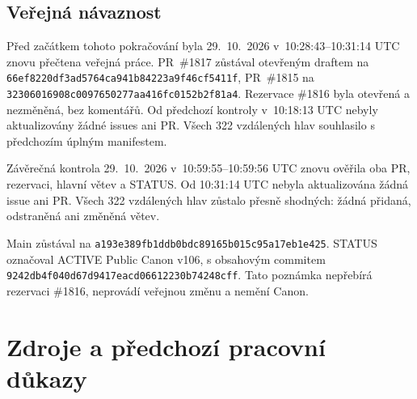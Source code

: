 \documentclass[11pt,a4paper]{article}
\theoremstyle{remark}\newtheorem{remark}[theorem]{Poznámka}
\numberwithin{equation}{section}
\begin{document}
\subsection{Veřejná návaznost}

Před začátkem tohoto pokračování byla 29.~10.~2026
v~10:28:43--10:31:14 UTC znovu přečtena veřejná práce.
PR~\#1817 zůstával otevřeným draftem na
\nolinkurl{66ef8220df3ad5764ca941b84223a9f46cf5411f},
PR~\#1815 na
\nolinkurl{32306016908c0097650277aa416fc0152b2f81a4}.
Rezervace \#1816 byla otevřená a nezměněná, bez komentářů.
Od předchozí kontroly v~10:18:13 UTC nebyly aktualizovány
žádné issues ani PR. Všech 322 vzdálených hlav souhlasilo
s předchozím úplným manifestem.

Závěrečná kontrola 29.~10.~2026 v~10:59:55--10:59:56 UTC
znovu ověřila oba PR, rezervaci, hlavní větev a STATUS.
Od 10:31:14 UTC nebyla aktualizována žádná issue ani PR.
Všech 322 vzdálených hlav zůstalo přesně shodných:
žádná přidaná, odstraněná ani změněná větev.

Main zůstával na
\nolinkurl{a193e389fb1ddb0bdc89165b015c95a17eb1e425}.
STATUS označoval ACTIVE Public Canon v106,
s obsahovým commitem
\nolinkurl{9242db4f040d67d9417eacd06612230b74248cff}.
Tato poznámka nepřebírá rezervaci \#1816, neprovádí
veřejnou změnu a nemění Canon.

\clearpage
\section{Zdroje a předchozí pracovní důkazy}
\end{document}
